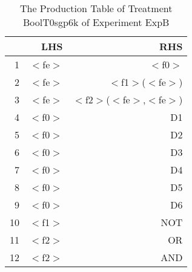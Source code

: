 \begin{table}[ht]
\centering
\begin{tabular}{rrr}
  \hline
 & LHS & RHS \\ 
  \hline
1 & $<$fe$>$ & $<$f0$>$ \\ 
  2 & $<$fe$>$ & $<$f1$>$($<$fe$>$) \\ 
  3 & $<$fe$>$ & $<$f2$>$($<$fe$>$,$<$fe$>$) \\ 
  4 & $<$f0$>$ & D1 \\ 
  5 & $<$f0$>$ & D2 \\ 
  6 & $<$f0$>$ & D3 \\ 
  7 & $<$f0$>$ & D4 \\ 
  8 & $<$f0$>$ & D5 \\ 
  9 & $<$f0$>$ & D6 \\ 
  10 & $<$f1$>$ & NOT \\ 
  11 & $<$f2$>$ & OR \\ 
  12 & $<$f2$>$ & AND \\ 
   \hline
\end{tabular}
\caption{The Production Table of Treatment BoolT0sgp6k of Experiment ExpB} 
\end{table}

